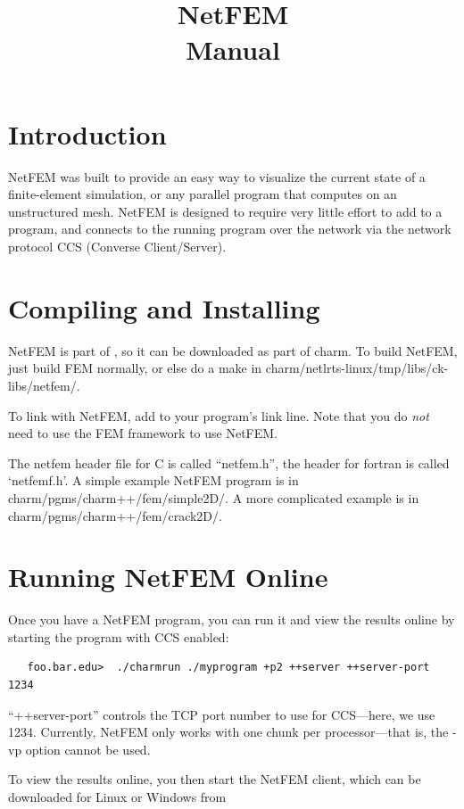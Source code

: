 \documentclass[10pt]{article}
\title{\charmpp\\ NetFEM\\ Manual}
\begin{document}
\maketitle

\section{Introduction}

NetFEM was built to provide an easy way to visualize
the current state of a finite-element simulation, or any 
parallel program that computes on an unstructured mesh.
NetFEM is designed to require very little effort to add
to a program, and connects to the running program over
the network via the network protocol CCS (Converse Client/Server).


\section{Compiling and Installing}

NetFEM is part of \charmpp{}, so it can be downloaded
as part of charm.  To build NetFEM, just build FEM normally,
or else do a make in charm/netlrts-linux/tmp/libs/ck-libs/netfem/.

To link with NetFEM, add  to your
program's link line.  Note that you do {\em not} need to use
the FEM framework to use NetFEM.

The netfem header file for C is called ``netfem.h'',
the header for fortran is called `netfemf.h'.
A simple example NetFEM program is in 
  charm/pgms/charm++/fem/simple2D/.
A more complicated example is in
  charm/pgms/charm++/fem/crack2D/.


\section{Running NetFEM Online}

Once you have a NetFEM program, you can run it and view 
the results online by starting the program with CCS enabled:

\begin{verbatim}
   foo.bar.edu>  ./charmrun ./myprogram +p2 ++server ++server-port 1234
\end{verbatim}

``++server-port'' controls the TCP port number to use for CCS---here,
we use 1234.  Currently, NetFEM only works with one chunk per
processor---that is, the -vp option cannot be used.

To view the results online, you then start the NetFEM client, 
which can be downloaded for Linux or Windows from 
\end{document}

